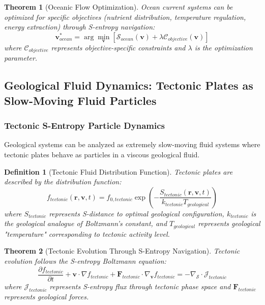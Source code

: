 \documentclass[12pt,a4paper]{article}
\newtheorem{theorem}{Theorem}
\newtheorem{definition}{Definition}
\begin{document}
\begin{theorem}[Oceanic Flow Optimization]
Ocean current systems can be optimized for specific objectives (nutrient distribution, temperature regulation, energy extraction) through S-entropy navigation:
\begin{equation}
\mathbf{v}_{ocean}^* = \arg\min_{\mathbf{v}} \left[ \mathcal{S}_{ocean}(\mathbf{v}) + \lambda \mathcal{C}_{objective}(\mathbf{v}) \right]
\end{equation}
where $\mathcal{C}_{objective}$ represents objective-specific constraints and $\lambda$ is the optimization parameter.
\end{theorem}

\subsection{Geological Fluid Dynamics: Tectonic Plates as Slow-Moving Fluid Particles}

\subsubsection{Tectonic S-Entropy Particle Dynamics}

Geological systems can be analyzed as extremely slow-moving fluid systems where tectonic plates behave as particles in a viscous geological fluid.

\begin{definition}[Tectonic Fluid Distribution Function]
Tectonic plates are described by the distribution function:
\begin{equation}
f_{tectonic}(\mathbf{r}, \mathbf{v}, t) = f_{0,tectonic} \exp\left(-\frac{S_{tectonic}(\mathbf{r}, \mathbf{v}, t)}{k_{tectonic} T_{geological}}\right)
\end{equation}
where $S_{tectonic}$ represents S-distance to optimal geological configuration, $k_{tectonic}$ is the geological analogue of Boltzmann's constant, and $T_{geological}$ represents geological "temperature" corresponding to tectonic activity level.
\end{definition}

\begin{theorem}[Tectonic Evolution Through S-Entropy Navigation]
Tectonic evolution follows the S-entropy Boltzmann equation:
\begin{equation}
\frac{\partial f_{tectonic}}{\partial t} + \mathbf{v} \cdot \nabla f_{tectonic} + \mathbf{F}_{tectonic} \cdot \nabla_{\mathbf{v}} f_{tectonic} = -\nabla_{\mathcal{S}} \cdot \mathcal{J}_{tectonic}
\end{equation}
where $\mathcal{J}_{tectonic}$ represents S-entropy flux through tectonic phase space and $\mathbf{F}_{tectonic}$ represents geological forces.
\end{theorem}
\end{document}

